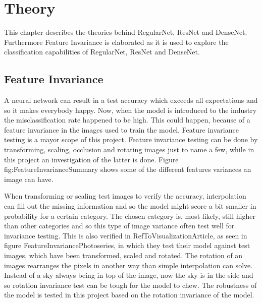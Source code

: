 \chapter{Theory}
\label{chp:theory}

This chapter describes the theories behind RegularNet, ResNet and DenseNet. Furthermore Feature Invariance is elaborated as it is used to explore the classification capabilities of RegularNet, ResNet and DenseNet.

\section{Feature Invariance}
A neural network can result in a test accuracy which exceeds all expectations and so it makes everybody happy. Now, when the model is introduced to the industry the misclassification rate happened to be high. This could happen, because of a feature invariance in the images used to train the model. Feature invariance testing is a mayor scope of this project. Feature invariance testing can be done by transforming, scaling, occlusion and rotating images just to name a few, while in this project an investigation of the latter is done. Figure fig:FeatureInvarianceSummary shows some of the different features variances an image can have.

\FloatBarrier

When transforming or scaling test images to verify the accuracy, interpolation can fill out the missing information and so the model might score a bit smaller in probability for a certain category. The chosen category is, most likely, still higher than other categories and so this type of image variance often test well for invariance testing. This is also verified in RefToVisualizationArticle, as seen in figure FeatureInvariancePhotoseries, in which they test their model against test images, which have been transformed, scaled and rotated. The rotation of an images rearranges the pixels in another way than simple interpolation can solve. Instead of a sky always being in top of the image, now the sky is in the side and so rotation invariance test can be tough for the model to chew. The robustness of the model is tested in this project based on the rotation invariance of the model.

\FloatBarrier






